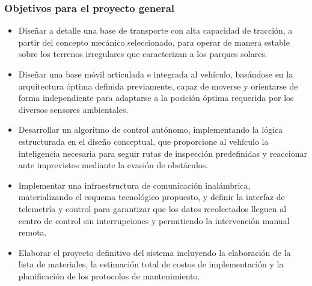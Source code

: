 \documentclass[../../General.tex]{subfiles}
\begin{document}
\subsubsection{Objetivos para el proyecto general}
\begin{itemize}
    \item Diseñar a detalle una base de transporte con alta capacidad de tracción, a partir del concepto mecánico seleccionado, para operar de manera estable sobre los terrenos irregulares que caracterizan a los parques solares.
    \item Diseñar una base móvil articulada e integrada al vehículo, basándose en la arquitectura óptima definida previamente, capaz de moverse y orientarse de forma independiente para adaptarse a la posición óptima requerida por los diversos sensores ambientales.
    \item Desarrollar un algoritmo de control autónomo, implementando la lógica estructurada en el diseño conceptual, que proporcione al vehículo la inteligencia necesaria para seguir rutas de inspección predefinidas y reaccionar ante imprevistos mediante la evasión de obstáculos.
    \item Implementar una infraestructura de comunicación inalámbrica, materializando el esquema tecnológico propuesto, y definir la interfaz de telemetría y control para garantizar que los datos recolectados lleguen al centro de control sin interrupciones y permitiendo la intervención manual remota.
    \item Elaborar el proyecto definitivo del sistema incluyendo la elaboración de la lista de materiales, la estimación total de costos de implementación y la planificación de los protocolos de mantenimiento.
\end{itemize}
\end{document}
